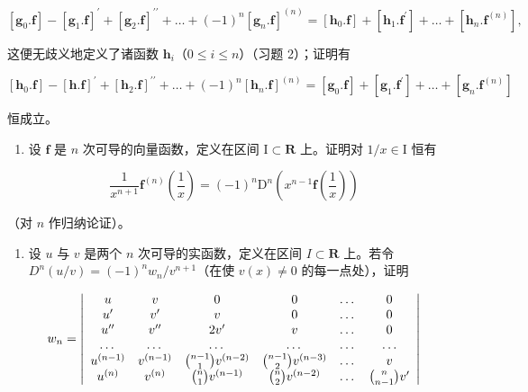 \[
[ \mathbf {g} _ {0}. \mathbf {f} ] - [ \mathbf {g} _ {1}. \mathbf {f} ] ^ {\prime} + [ \mathbf {g} _ {2}. \mathbf {f} ] ^ {\prime \prime} + \dots + (- 1) ^ {n} [ \mathbf {g} _ {n}. \mathbf {f} ] ^ {(n)} = [ \mathbf {h} _ {0}. \mathbf {f} ] + [ \mathbf {h} _ {1}. \mathbf {f} ^ {\prime} ] + \dots + [ \mathbf {h} _ {n}. \mathbf {f} ^ {(n)} ],
\]

这便无歧义地定义了诸函数 \(\mathbf{h}_i\)（\(0 \leqslant i \leqslant n\)）（习题 2）；证明有

\[
[ \mathbf {h} _ {0}. \mathbf {f} ] - [ \mathbf {h}. \mathbf {f} ] ^ {\prime} + [ \mathbf {h} _ {2}. \mathbf {f} ] ^ {\prime \prime} + \dots + (- 1) ^ {n} [ \mathbf {h} _ {n}. \mathbf {f} ] ^ {(n)} = [ \mathbf {g} _ {0}. \mathbf {f} ] + [ \mathbf {g} _ {1}. \mathbf {f} ^ {\prime} ] + \dots + [ \mathbf {g} _ {n}. \mathbf {f} ^ {(n)} ]
\]

恒成立。

\begin{enumerate}
\def\labelenumi{\arabic{enumi})}
\setcounter{enumi}{3}
\tightlist
\item
  设 \(\mathbf{f}\) 是 \(n\) 次可导的向量函数，定义在区间 \(\mathrm{I} \subset \mathbf{R}\) 上。证明对 \(1 / x \in \mathrm{I}\) 恒有
\end{enumerate}

\[
\frac {1}{x ^ {n + 1}} \mathbf {f} ^ {(n)} \left(\frac {1}{x}\right) = (- 1) ^ {n} \mathrm{D} ^ {n} \left(x ^ {n - 1} \mathbf {f} \left(\frac {1}{x}\right)\right)
\]

（对 \(n\) 作归纳论证）。

\begin{enumerate}
\def\labelenumi{\arabic{enumi})}
\setcounter{enumi}{4}
\tightlist
\item
  设 \(u\) 与 \(v\) 是两个 \(n\) 次可导的实函数，定义在区间 \(I \subset \mathbf{R}\) 上。若令 \(D^n(u / v) = (-1)^n w_n / v^{n+1}\)（在使 \(v(x) \neq 0\) 的每一点处），证明
\end{enumerate}

\[
w _ {n} = \left| \begin{array}{c c c c c c} u & v & 0 & 0 & \dots & 0 \\ u ^ {\prime} & v ^ {\prime} & v & 0 & \dots & 0 \\ u ^ {\prime \prime} & v ^ {\prime \prime} & 2 v ^ {\prime} & v & \dots & 0 \\ \dots & \dots & \dots & \dots & \dots & \dots \\ u ^ {(n - 1)} & v ^ {(n - 1)} & \binom {n - 1} {1} v ^ {(n - 2)} & \binom {n - 1} {2} v ^ {(n - 3)} & \dots & v \\ u ^ {(n)} & v ^ {(n)} & \binom {n} {1} v ^ {(n - 1)} & \binom {n} {2} v ^ {(n - 2)} & \dots & \binom {n} {n - 1} v ^ {\prime} \end{array} \right|
\]


